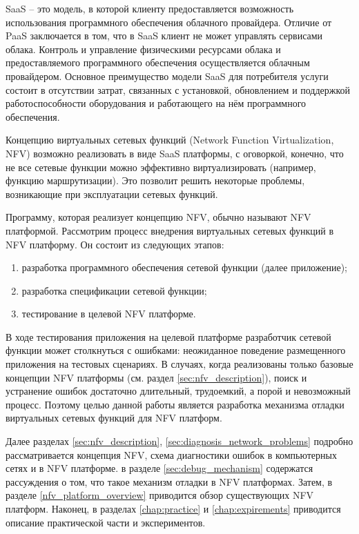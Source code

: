 \documentclass[oneside,final,14pt,a4paper]{extreport}
\begin{document}
SaaS -- это модель, в которой клиенту предоставляется возможность использования программного обеспечения облачного провайдера. Отличие от PaaS заключается в том, что в SaaS клиент не может управлять сервисами облака.  Контроль и управление физическими ресурсами облака и предоставляемого программного обеспечения осуществляется облачным провайдером. Основное преимущество модели SaaS для потребителя услуги состоит в отсутствии затрат, связанных с установкой, обновлением и поддержкой работоспособности оборудования и работающего на нём программного обеспечения.

Концепцию виртуальных сетевых функций (Network Function Virtualization, NFV) возможно реализовать в виде SaaS платформы, с оговоркой, конечно, что не все сетевые функции можно эффективно виртуализировать (например, функцию маршрутизации). Это позволит решить некоторые проблемы, возникающие при эксплуатации сетевых функций. 

Программу, которая реализует концепцию NFV, обычно называют NFV платформой. Рассмотрим процесс внедрения виртуальных сетевых функций в NFV платформу. Он состоит из следующих этапов:
\begin{enumerate}
    \item разработка программного обеспечения сетевой функции (далее приложение);
    \item разработка спецификации сетевой функции;
    \item тестирование в целевой NFV платформе.
\end{enumerate}

В ходе тестирования приложения на целевой платформе разработчик сетевой функции может столкнуться с ошибками: неожиданное поведение размещенного приложения на тестовых сценариях. В случаях, когда реализованы только базовые концепции NFV платформы (см. раздел \ref{sec:nfv_description}), поиск и устранение ошибок достаточно длительный, трудоемкий, а порой и невозможный процесс. Поэтому целью данной работы является разработка механизма отладки виртуальных сетевых функций для NFV платформ.

Далее разделах \ref{sec:nfv_description}, \ref{sec:diagnosis_network_problems} подробно рассматривается концепция NFV, схема диагностики ошибок в компьютерных сетях и в NFV платформе. в разделе \ref{sec:debug_mechanism} содержатся рассуждения о том, что такое механизм отладки в NFV платформах. Затем, в разделе \ref{nfv_platform_overview} приводится обзор существующих NFV платформ. Наконец, в разделах \ref{chap:practice} и \ref{chap:expirements} приводится описание практической части и экспериментов.
\end{document}
